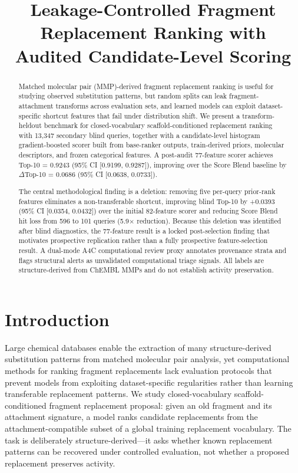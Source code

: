 \documentclass[12pt,letterpaper]{article}
\title{Leakage-Controlled Fragment Replacement Ranking with Audited Candidate-Level Scoring}
\date{}
\begin{document}
\maketitle


\begin{abstract}
Matched molecular pair (MMP)-derived fragment replacement ranking is useful for studying observed substitution patterns, but random splits can leak fragment-attachment transforms across evaluation sets, and learned models can exploit dataset-specific shortcut features that fail under distribution shift. We present a transform-heldout benchmark for closed-vocabulary scaffold-conditioned replacement ranking with 13,347 secondary blind queries, together with a candidate-level histogram gradient-boosted scorer built from base-ranker outputs, train-derived priors, molecular descriptors, and frozen categorical features. A post-audit 77-feature scorer achieves Top-10 = 0.9243 (95\% CI [0.9199, 0.9287]), improving over the Score Blend baseline by $\Delta$Top-10 = 0.0686 (95\% CI [0.0638, 0.0733]).

The central methodological finding is a deletion: removing five per-query prior-rank features eliminates a non-transferable shortcut, improving blind Top-10 by +0.0393 (95\% CI [0.0354, 0.0432]) over the initial 82-feature scorer and reducing Score Blend hit loss from 596 to 101 queries (5.9$\times$ reduction). Because this deletion was identified after blind diagnostics, the 77-feature result is a locked post-selection finding that motivates prospective replication rather than a fully prospective feature-selection result. A dual-mode A4C computational review proxy annotates provenance strata and flags structural alerts as unvalidated computational triage signals. All labels are structure-derived from ChEMBL MMPs and do not establish activity preservation.
\end{abstract}


\section{Introduction}

Large chemical databases enable the extraction of many structure-derived substitution patterns from matched molecular pair analysis, yet computational methods for ranking fragment replacements lack evaluation protocols that prevent models from exploiting dataset-specific regularities rather than learning transferable replacement patterns. We study closed-vocabulary scaffold-conditioned fragment replacement proposal: given an old fragment and its attachment signature, a model ranks candidate replacements from the attachment-compatible subset of a global training replacement vocabulary. The task is deliberately structure-derived---it asks whether known replacement patterns can be recovered under controlled evaluation, not whether a proposed replacement preserves activity.
\end{document}
